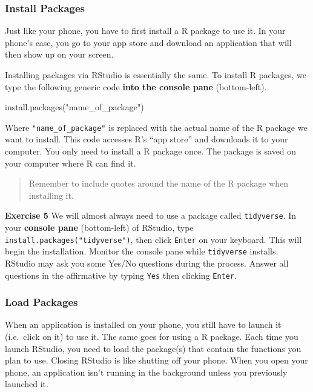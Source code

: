 \documentclass[
]{book}
\makeatletter
\newenvironment{Shaded}{\begin{snugshade}}{\end{snugshade}}
\newcommand{\FunctionTok}[1]{\textcolor[rgb]{0,0,0}{#1}}
\newcommand{\NormalTok}[1]{#1}
\newcommand{\StringTok}[1]{\textcolor[rgb]{0.5,0.5,0.5}{#1}}
\newenvironment{kframe}{%
\medskip{}
\setlength{\fboxsep}{.8em}
 \def\at@end@of@kframe{}%
 \ifinner\ifhmode%
  \def\at@end@of@kframe{\end{minipage}}%
  \begin{minipage}{\columnwidth}%
 \fi\fi%
 \def\FrameCommand##1{\hskip\@totalleftmargin \hskip-\fboxsep
 \colorbox{shadecolor}{##1}\hskip-\fboxsep
     \hskip-\linewidth \hskip-\@totalleftmargin \hskip\columnwidth}%
 \MakeFramed {\advance\hsize-\width
   \@totalleftmargin\z@ \linewidth\hsize
   \@setminipage}}%
 {\par\unskip\endMakeFramed%
 \at@end@of@kframe}
\renewenvironment{Shaded}{\begin{kframe}}{\end{kframe}}
\newenvironment{rmdblock}[1]
  {\begin{shaded*}
  }
  {\end{shaded*}
  }
\newenvironment{learncheck}
  {\begin{rmdblock}{warning}}
  {\end{rmdblock}}
\makeatother
\begin{document}
\hypertarget{install-packages}{%
\subsubsection*{Install Packages}\label{install-packages}}


Just like your phone, you have to first install a R package to use it. In your phone's case, you go to your app store and download an application that will then show up on your screen.

Installing packages via RStudio is essentially the same. To install R packages, we type the following generic code \textbf{into the console pane} (bottom-left).

\begin{Shaded}
\begin{Highlighting}[]
\FunctionTok{install.packages}\NormalTok{(}\StringTok{"name\_of\_package"}\NormalTok{)}
\end{Highlighting}
\end{Shaded}

Where \texttt{"name\_of\_package"} is replaced with the actual name of the R package we want to install. This code accesses R's ``app store'' and downloads it to your computer. You only need to install a R package once. The package is saved on your computer where R can find it.

\begin{quote}
Remember to include quotes around the name of the R package when installing it.
\end{quote}

\begin{learncheck}
\textbf{Exercise 5} We will almost always need to use a package called
\texttt{tidyverse}. In your \textbf{console pane} (bottom-left) of
RStudio, type \texttt{install.packages("tidyverse")}, then click
\texttt{Enter} on your keyboard. This will begin the installation.
Monitor the console pane while \texttt{tidyverse} installs. RStudio may
ask you some Yes/No questions during the process. Answer all questions
in the affirmative by typing \texttt{Yes} then clicking \texttt{Enter}.
\end{learncheck}

\hypertarget{load-packages}{%
\subsubsection*{Load Packages}\label{load-packages}}


When an application is installed on your phone, you still have to launch it (i.e.~click on it) to use it. The same goes for using a R package. Each time you launch RStudio, you need to load the package(s) that contain the functions you plan to use. Closing RStudio is like shutting off your phone. When you open your phone, an application isn't running in the background unless you previously launched it.
\end{document}
